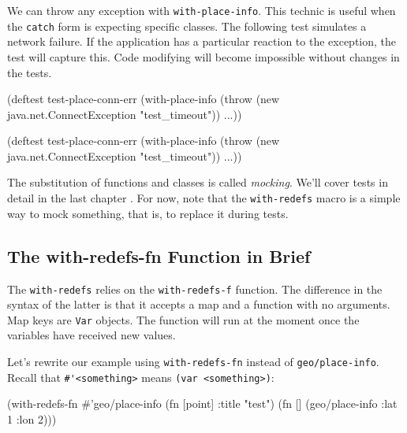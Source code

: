 \fi

We can throw any exception with \verb|with-place-info|. This technic is useful when the \verb|catch| form is expecting specific classes.
The following test simulates a network failure.
If the application has a particular reaction to the exception, the test will capture this.
Code modifying will become impossible without changes in the tests.


\ifx\DEVICETYPE\MOBILE

\begin{clojure}
(deftest test-place-conn-err
  (with-place-info
    (throw (new java.net.ConnectException
             "test_timeout"))
    ...))
\end{clojure}

\else

\begin{clojure}
(deftest test-place-conn-err
  (with-place-info
    (throw (new java.net.ConnectException "test_timeout"))
    ...))
\end{clojure}

\fi


The substitution of functions and classes is called \emph{mocking}.
We'll cover tests in detail in the last chapter .
For now, note that the \verb|with-redefs| macro is a simple way to mock something, that is, to replace it during tests.

\subsection{The with-redefs-fn Function in Brief}


The \verb|with-redefs| relies on the \verb|with-redefs-f| function. The
difference in the syntax of the latter is that it accepts a map and a function
with no arguments.  Map keys are \verb|Var| objects. The function will run at
the moment once the variables have received new values.

Let's rewrite our example using \verb|with-redefs-fn| instead of \verb|geo/place-info|.
Recall that \verb|#'|\texttt{<some\-thing>} means \verb|(var <something>)|:

\ifx\DEVICETYPE\MOBILE

\begin{clojure}
(with-redefs-fn
  {#'geo/place-info (fn [point]
                      {:title "test"})}
  (fn []
    (geo/place-info {:lat 1 :lon 2})))
\end{clojure}

